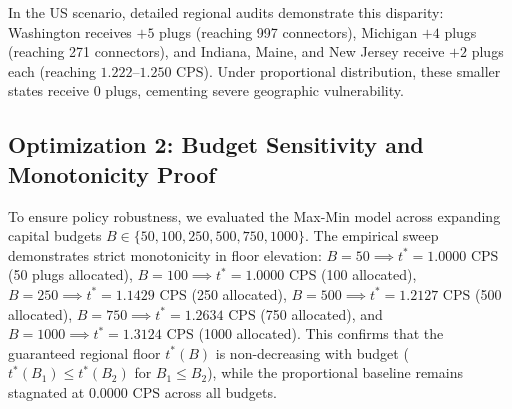 \documentclass[conference]{IEEEtran}
\begin{document}
In the US scenario, detailed regional audits demonstrate this disparity: Washington receives $+5$ plugs (reaching 997 connectors), Michigan $+4$ plugs (reaching 271 connectors), and Indiana, Maine, and New Jersey receive $+2$ plugs each (reaching $1.222\text{--}1.250\text{ CPS}$). Under proportional distribution, these smaller states receive 0 plugs, cementing severe geographic vulnerability.

\subsection{Optimization 2: Budget Sensitivity and Monotonicity Proof}
To ensure policy robustness, we evaluated the Max-Min model across expanding capital budgets $B \in \{50, 100, 250, 500, 750, 1000\}$. The empirical sweep demonstrates strict monotonicity in floor elevation: $B = 50 \implies t^* = 1.0000\text{ CPS}$ (50 plugs allocated), $B = 100 \implies t^* = 1.0000\text{ CPS}$ (100 allocated), $B = 250 \implies t^* = 1.1429\text{ CPS}$ (250 allocated), $B = 500 \implies t^* = 1.2127\text{ CPS}$ (500 allocated), $B = 750 \implies t^* = 1.2634\text{ CPS}$ (750 allocated), and $B = 1000 \implies t^* = 1.3124\text{ CPS}$ (1000 allocated). This confirms that the guaranteed regional floor $t^*(B)$ is non-decreasing with budget ($t^*(B_1) \le t^*(B_2)$ for $B_1 \le B_2$), while the proportional baseline remains stagnated at $0.0000\text{ CPS}$ across all budgets.

\end{document}
